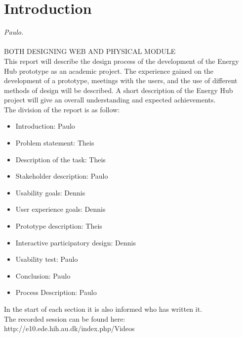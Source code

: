 
\section{Introduction}\textit{Paulo.}\\
\\ BOTH DESIGNING WEB AND PHYSICAL MODULE
\\
This report will describe the design process of the development of the Energy Hub prototype as an academic project. The experience gained on the development of a prototype, meetings with the users, and the use of different methods of design will be described. A short description of the Energy Hub project will give an overall understanding and expected achievements.
\\ The division of the report is as follow: 
\begin{itemize}
	\item Introduction: Paulo
	\item Problem statement: Theis
	\item Description of the task: Theis
	\item Stakeholder description: Paulo
	\item Usability goals: Dennis
	\item User experience goals: Dennis
	\item Prototype description: Theis
	\item Interactive participatory design: Dennis
	\item Usability test: Paulo
	\item Conclusion: Paulo
	\item Process Description: Paulo
\end{itemize}
In the start of each section it is also informed who has written it.
\\
The recorded session can be found here: http://e10.ede.hih.au.dk/index.php/Videos